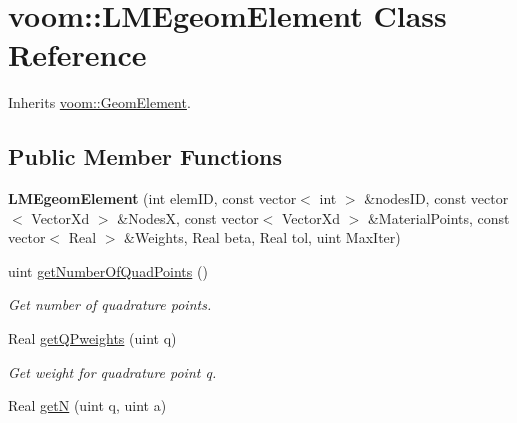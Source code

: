 \hypertarget{classvoom_1_1_l_m_egeom_element}{
\section{voom::LMEgeomElement Class Reference}
\label{classvoom_1_1_l_m_egeom_element}
}


Inherits \hyperlink{classvoom_1_1_geom_element}{voom::GeomElement}.\subsection*{Public Member Functions}
\begin{DoxyCompactItemize}
\item 
\hypertarget{classvoom_1_1_l_m_egeom_element_a807390f4baf7cde0ed2f923d1643df75}{
{\bfseries LMEgeomElement} (int elemID, const vector$<$ int $>$ \&nodesID, const vector$<$ VectorXd $>$ \&NodesX, const vector$<$ VectorXd $>$ \&MaterialPoints, const vector$<$ Real $>$ \&Weights, Real beta, Real tol, uint MaxIter)}
\label{classvoom_1_1_l_m_egeom_element_a807390f4baf7cde0ed2f923d1643df75}

\item 
\hypertarget{classvoom_1_1_l_m_egeom_element_a94ef0f7f63985f62559ba3d76fa64701}{
uint \hyperlink{classvoom_1_1_l_m_egeom_element_a94ef0f7f63985f62559ba3d76fa64701}{getNumberOfQuadPoints} ()}
\label{classvoom_1_1_l_m_egeom_element_a94ef0f7f63985f62559ba3d76fa64701}

\begin{DoxyCompactList}\small\item\em Get number of quadrature points. \item\end{DoxyCompactList}\item 
\hypertarget{classvoom_1_1_l_m_egeom_element_a7241a1fd60ce90072090a087e1d4f82a}{
Real \hyperlink{classvoom_1_1_l_m_egeom_element_a7241a1fd60ce90072090a087e1d4f82a}{getQPweights} (uint q)}
\label{classvoom_1_1_l_m_egeom_element_a7241a1fd60ce90072090a087e1d4f82a}

\begin{DoxyCompactList}\small\item\em Get weight for quadrature point q. \item\end{DoxyCompactList}\item 
\hypertarget{classvoom_1_1_l_m_egeom_element_acc100afa58be9cedaf08cb2d07b5f091}{
Real \hyperlink{classvoom_1_1_l_m_egeom_element_acc100afa58be9cedaf08cb2d07b5f091}{getN} (uint q, uint a)}
\label{classvoom_1_1_l_m_egeom_element_acc100afa58be9cedaf08cb2d07b5f091}


\end{DoxyCompactItemize}
